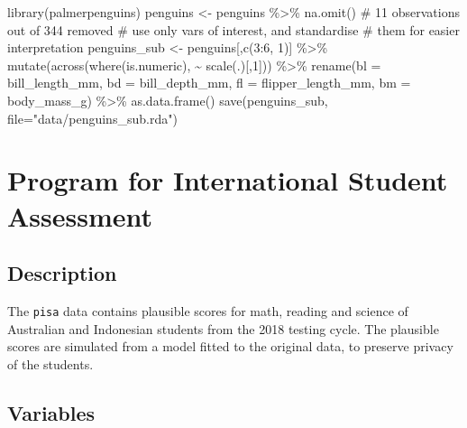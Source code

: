 \documentclass[
  letterpaper,
]{krantz}
\newenvironment{Shaded}{\begin{snugshade}}{\end{snugshade}}
\newcommand{\AttributeTok}[1]{\textcolor[rgb]{0.40,0.45,0.13}{#1}}
\newcommand{\CommentTok}[1]{\textcolor[rgb]{0.37,0.37,0.37}{#1}}
\newcommand{\DecValTok}[1]{\textcolor[rgb]{0.68,0.00,0.00}{#1}}
\newcommand{\FunctionTok}[1]{\textcolor[rgb]{0.28,0.35,0.67}{#1}}
\newcommand{\NormalTok}[1]{\textcolor[rgb]{0.00,0.23,0.31}{#1}}
\newcommand{\OtherTok}[1]{\textcolor[rgb]{0.00,0.23,0.31}{#1}}
\newcommand{\SpecialCharTok}[1]{\textcolor[rgb]{0.37,0.37,0.37}{#1}}
\newcommand{\StringTok}[1]{\textcolor[rgb]{0.13,0.47,0.30}{#1}}
\begin{document}
\begin{Shaded}
\begin{Highlighting}[]
\FunctionTok{library}\NormalTok{(palmerpenguins)}
\NormalTok{penguins }\OtherTok{\textless{}{-}}\NormalTok{ penguins }\SpecialCharTok{\%\textgreater{}\%}
  \FunctionTok{na.omit}\NormalTok{() }\CommentTok{\# 11 observations out of 344 removed}
\CommentTok{\# use only vars of interest, and standardise}
\CommentTok{\# them for easier interpretation}
\NormalTok{penguins\_sub }\OtherTok{\textless{}{-}}\NormalTok{ penguins[,}\FunctionTok{c}\NormalTok{(}\DecValTok{3}\SpecialCharTok{:}\DecValTok{6}\NormalTok{, }\DecValTok{1}\NormalTok{)] }\SpecialCharTok{\%\textgreater{}\%} 
  \FunctionTok{mutate}\NormalTok{(}\FunctionTok{across}\NormalTok{(}\FunctionTok{where}\NormalTok{(is.numeric),  }\SpecialCharTok{\textasciitilde{}} \FunctionTok{scale}\NormalTok{(.)[,}\DecValTok{1}\NormalTok{])) }\SpecialCharTok{\%\textgreater{}\%}
  \FunctionTok{rename}\NormalTok{(}\AttributeTok{bl =}\NormalTok{ bill\_length\_mm,}
         \AttributeTok{bd =}\NormalTok{ bill\_depth\_mm,}
         \AttributeTok{fl =}\NormalTok{ flipper\_length\_mm,}
         \AttributeTok{bm =}\NormalTok{ body\_mass\_g) }\SpecialCharTok{\%\textgreater{}\%}
  \FunctionTok{as.data.frame}\NormalTok{()}
\FunctionTok{save}\NormalTok{(penguins\_sub, }\AttributeTok{file=}\StringTok{"data/penguins\_sub.rda"}\NormalTok{)}
\end{Highlighting}
\end{Shaded}

\section{Program for International Student
Assessment}\label{program-for-international-student-assessment}

\subsection*{Description}\label{description-4}

The \texttt{pisa} data contains plausible scores for math, reading and
science of Australian and Indonesian students from the 2018 testing
cycle. The plausible scores are simulated from a model fitted to the
original data, to preserve privacy of the students.

\subsection*{Variables}\label{variables-4}
\end{document}
